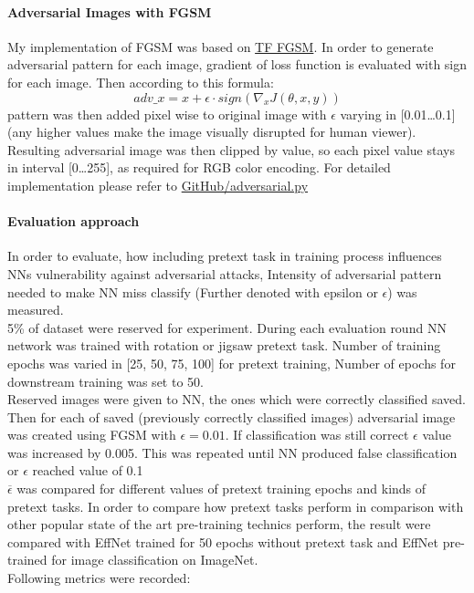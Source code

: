 \paragraph{Adversarial Images with FGSM}
My implementation of FGSM was based on \href{https://www.tensorflow.org/tutorials/generative/adversarial_fgsm}{TF FGSM}.
In order to generate adversarial pattern for each image, gradient of loss function is evaluated with sign for each image.
Then according to this formula:
\begin{equation}
    adv\_x = x + \epsilon \cdot sign(\nabla_x J(\theta, x, y))
\end{equation}
pattern was then added pixel wise to original image with $\epsilon$ varying in [0.01\ldots0.1]
(any higher values make the image visually disrupted for human viewer).
Resulting adversarial image was then clipped by value, so each pixel value stays in interval [0\ldots255],
as required for RGB color encoding.
For detailed implementation please refer to \href{https://github.com/Goofy-Goof/ISS/blob/33a2ad40b779ff230aae31c29d2edc2cf5d90406/impl/util/adversarial.py}{GitHub/adversarial.py}


\paragraph{Evaluation approach}
In order to evaluate, how including pretext task in training process influences NNs vulnerability against adversarial attacks,
Intensity of adversarial pattern needed to make NN miss classify (Further denoted with epsilon or $\epsilon$) was measured.
\\
5\% of dataset were reserved for experiment.
During each evaluation round NN network was trained with rotation or jigsaw pretext task.
Number of training epochs was varied in [25, 50, 75, 100] for pretext training, Number of epochs for downstream training was set to 50.
\\
Reserved images were given to NN, the ones which were correctly classified saved.
Then for each of saved (previously correctly classified images) adversarial image was created using FGSM with $\epsilon = 0.01$.
If classification was still correct $\epsilon$ value was increased by 0.005.
This was repeated until NN produced false classification or $\epsilon$ reached value of 0.1
\\
$\overline{\epsilon}$ was compared for different values of pretext training epochs and kinds of pretext tasks.
In order to compare how pretext tasks perform in comparison with other popular state of the art pre-training technics perform,
the result were compared with EffNet trained for 50 epochs without pretext task and EffNet pre-trained for image classification on ImageNet.
\\
Following metrics were recorded:

